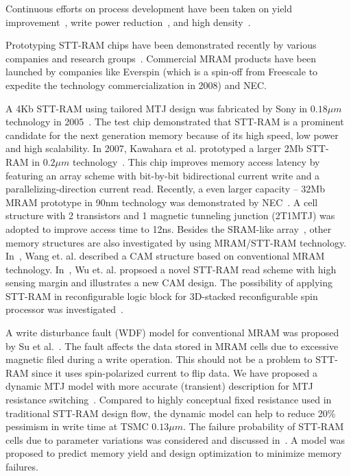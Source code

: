 Continuous efforts on process development have been taken on yield improvement~\cite{Miura07}, write power reduction~\cite{Durlam03}, and high density~\cite{Lou08}.

Prototyping STT-RAM chips have been demonstrated recently by various companies and research groups~\cite{Hosomi05,Kawahara07,Nebashi09,Motoyoshi04,Andre05,Kawahara08}. Commercial MRAM products have been launched by companies like Everspin (which is a spin-off from Freescale to expedite the technology commercialization in 2008) and NEC.




A 4Kb STT-RAM using tailored MTJ design was fabricated by Sony in $0.18{\mu}m$ technology in 2005~\cite{Hosomi05}. The test chip demonstrated that STT-RAM is a prominent candidate for the next generation memory because of its high speed, low power and high scalability. In 2007, Kawahara et al. prototyped a larger 2Mb STT-RAM in $0.2{\mu}m$ technology~\cite{Kawahara07}. This chip improves memory access latency by featuring an array scheme with bit-by-bit bidirectional current write and a parallelizing-direction current read. Recently, a even larger capacity -- 32Mb MRAM prototype in 90nm technology was demonstrated by NEC~\cite{Nebashi09}. A cell structure with 2 transistors and 1 magnetic tunneling junction (2T1MTJ) was adopted to improve access time to 12ns. Besides the SRAM-like array~\cite{Motoyoshi04,Andre05,Kawahara08}, other memory structures are also investigated by using MRAM/STT-RAM technology. In~\cite{Wang07}, Wang et. al. described a CAM structure based on conventional MRAM technology. In~\cite{Xu08}, Wu et. al. propsoed a novel STT-RAM read scheme with high sensing margin and illustrates a new CAM design. The possibility of applying STT-RAM in reconfigurable logic block for 3D-stacked reconfigurable spin processor was investigated~\cite{Sekikawa08}.

A write disturbance fault (WDF) model for conventional MRAM was proposed by Su et al.~\cite{Su08}. The fault affects the data stored in MRAM cells due to excessive magnetic filed during a write operation.
This should not be a problem to STT-RAM since it uses spin-polarized current to flip data. We have proposed a dynamic MTJ model with more accurate (transient) description for MTJ resistance switching~\cite{Chen08}. Compared to highly conceptual fixed resistance used in traditional STT-RAM design flow, the dynamic model can help to reduce 20\% pessimism in write time at TSMC $0.13{\mu}m$. The failure probability of STT-RAM cells due to parameter variations was considered and discussed in~\cite{Li09}. A model was proposed to predict memory yield and design optimization to minimize memory failures.





